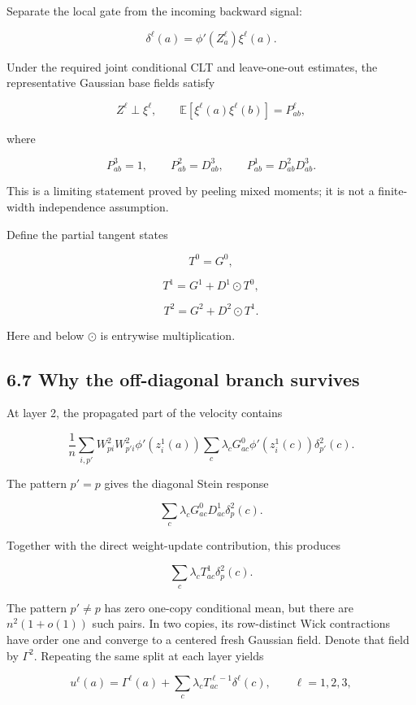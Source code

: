 Separate the local gate from the incoming backward signal:

\[
\delta^\ell(a)
=
\phi'(Z^\ell_a)\xi^\ell(a).
\]


Under the required joint conditional CLT and leave-one-out estimates, the
representative Gaussian base fields satisfy

\[
Z^\ell\perp\xi^\ell,
\qquad
\mathbb E[\xi^\ell(a)\xi^\ell(b)]
=
P^\ell_{ab},
\]


where

\[
P^3_{ab}=1,
\qquad
P^2_{ab}=D^3_{ab},
\qquad
P^1_{ab}=D^2_{ab}D^3_{ab}.
\]


This is a limiting statement proved by peeling mixed moments; it is not a
finite-width independence assumption.

Define the partial tangent states

\[
T^0=G^0,
\]


\[
T^1=G^1+D^1\odot T^0,
\]


\[
T^2=G^2+D^2\odot T^1.
\]


Here and below \(\odot\) is entrywise multiplication.

\subsection*{6.7 Why the off-diagonal branch survives}


At layer 2, the propagated part of the velocity contains

\[
\frac1n\sum_{i,p'}
W^2_{pi}W^2_{p'i}
\phi'(z_i^1(a))
\sum_c\lambda_cG^0_{ac}
\phi'(z_i^1(c))\delta_{p'}^2(c).
\]


The pattern \(p'=p\) gives the diagonal Stein response

\[
\sum_c\lambda_c
G^0_{ac}D^1_{ac}\delta_p^2(c).
\]


Together with the direct weight-update contribution, this produces

\[
\sum_c\lambda_cT^1_{ac}\delta_p^2(c).
\]


The pattern \(p'\ne p\) has zero one-copy conditional mean, but there are
\(n^2(1+o(1))\) such pairs. In two copies, its row-distinct Wick contractions
have order one and converge to a centered fresh Gaussian field. Denote that
field by \(\Gamma^2\). Repeating the same split at each layer yields

\[
\boxed{
u^\ell(a)
=
\Gamma^\ell(a)
+\sum_c\lambda_cT^{\ell-1}_{ac}\delta^\ell(c),
\qquad \ell=1,2,3,
}
\]


